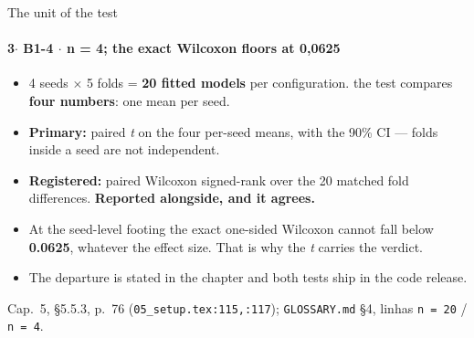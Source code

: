 \documentclass{beamer}
\begin{document}
\begin{frame}[noframenumbering]{The unit of the test}
    \framesubtitle{\normalsize 3$\cdot$ \textbf{B1-4} $\cdot$ n = 4; the exact Wilcoxon floors at 0,0625}
    \hypertarget{b14}{}
    \small
    \begin{itemize}\setlength{\itemsep}{0pt}\setlength{\parskip}{0pt}
        \item 4 seeds $\times$ 5 folds = \textbf{20 fitted models} per configuration. the test compares \textbf{four numbers}: one mean per seed.
        \item \textbf{Primary:} paired \textit{t} on the four per-seed means, with the 90\% CI --- folds inside a seed are not independent.
        \item \textbf{Registered:} paired Wilcoxon signed-rank over the 20 matched fold differences. \textbf{Reported alongside, and it agrees.}
        \item At the seed-level footing the exact one-sided Wilcoxon cannot fall below \textbf{0.0625}, whatever the effect size. That is why the \textit{t} carries the verdict.
        \item The departure is stated in the chapter and both tests ship in the code release.
    \end{itemize}
    \vfill
    {\scriptsize
    \begin{minipage}[b]{0.775\linewidth}\raggedright\textcolor{black!70}{Cap.~5, §5.5.3, p.~76 (\texttt{05\_setup.tex:115,:117}); \texttt{GLOSSARY.md} §4, linhas \texttt{n = 20} / \texttt{n = 4}.}\end{minipage}\hfill
    \begin{minipage}[b]{0.20\linewidth}\raggedleft \hyperlink{b0}{}\end{minipage}}
\end{frame}
\end{document}
